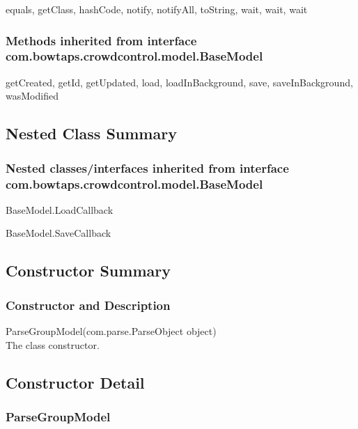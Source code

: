 equals, getClass, hashCode, notify, notifyAll, toString, wait, wait, wait\\

\subsubsection{Methods inherited from interface com.bowtaps.crowdcontrol.model.BaseModel}

getCreated, getId, getUpdated, load, loadInBackground, save, saveInBackground, wasModified\\



\subsection{Nested Class Summary}

\subsubsection{Nested classes/interfaces inherited from interface com.bowtaps.crowdcontrol.model.BaseModel}
\begin{DoxyCompactItemize}
\item  \hypertarget{class_BaseModel.Android.LoadCallBack}{BaseModel.LoadCallback}
\item  \hypertarget{class_BaseModel.Android.SaveCallback}{BaseModel.SaveCallback}
\end{DoxyCompactItemize} 


\subsection{Constructor Summary}

\subsubsection{Constructor and Description}
ParseGroupModel(com.parse.ParseObject object)\\
The class constructor.\\

\subsection{Constructor Detail}

\subsubsection{ParseGroupModel}

